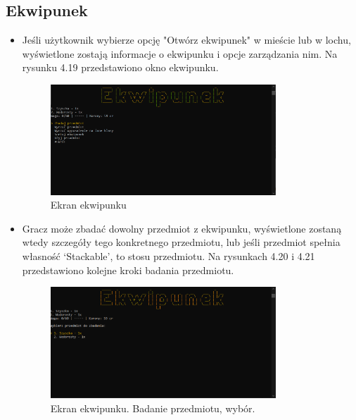 \subsection{Ekwipunek}
\begin{itemize}
        \item Jeśli użytkownik wybierze opcję "Otwórz ekwipunek" w mieście lub w lochu, wyświetlone zostają informacje o ekwipunku i opcje zarządzania nim.
        Na rysunku 4.19 przedstawiono okno ekwipunku.
            \begin{figure}[H]
                \centering
                \includegraphics[width=0.8\textwidth]{figures/warstwa_uzytkowa/ekwipunek_1.png}
                \caption{Ekran ekwipunku}
                \label{fig:inventory_1}
            \end{figure}
        \item Gracz może zbadać dowolny przedmiot z ekwipunku, wyświetlone zostaną wtedy szczegóły tego konkretnego przedmiotu, 
        lub jeśli przedmiot spełnia własność `Stackable', to stosu przedmiotu. Na rysunkach 4.20 i 4.21 przedstawiono kolejne kroki badania przedmiotu.
            \begin{figure}[H]
                \centering
                \includegraphics[width=0.8\textwidth]{figures/warstwa_uzytkowa/ekwipunek_2.png}
                \caption{Ekran ekwipunku. Badanie przedmiotu, wybór.}
                \label{fig:inventory_2}
            \end{figure}
            \begin{figure}[H]

\end{figure}
\end{itemize}
